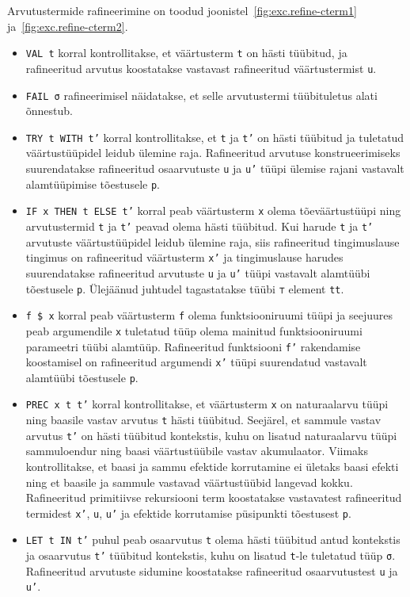 \documentclass[a4paper,12pt]{article}
\begin{document}
Arvutustermide rafineerimine on toodud joonistel~\ref{fig:exc.refine-cterm1} ja~\ref{fig:exc.refine-cterm2}.
\begin{itemize}
\item {\tt VAL t} korral kontrollitakse, et väärtusterm {\tt t} on hästi tüübitud, ja rafineeritud arvutus koostatakse vastavast rafineeritud väärtustermist {\tt u}.
\item {\tt FAIL σ} rafineerimisel näidatakse, et selle arvutustermi tüübituletus alati õnnestub.
\item {\tt TRY t WITH t'} korral kontrollitakse, et {\tt t} ja {\tt t'} on hästi tüübitud ja tuletatud väärtustüüpidel leidub ülemine raja. Rafineeritud arvutuse konstrueerimiseks suurendatakse rafineeritud osaarvutuste {\tt u} ja {\tt u'} tüüpi ülemise rajani vastavalt alamtüüpimise tõestusele {\tt p}.
\item {\tt IF x THEN t ELSE t'} korral peab väärtusterm {\tt x} olema tõeväärtustüüpi ning arvutustermid {\tt t} ja {\tt t'} peavad olema hästi tüübitud. Kui harude {\tt t} ja {\tt t'} arvutuste väärtustüüpidel leidub ülemine raja, siis rafineeritud tingimuslause tingimus on rafineeritud väärtusterm {\tt x'} ja tingimuslause harudes suurendatakse rafineeritud arvutuste {\tt u} ja {\tt u'} tüüpi vastavalt alamtüübi tõestusele {\tt p}. Ülejäänud juhtudel tagastatakse tüübi {\tt ⊤} element {\tt tt}.
\item {\tt f \$ x} korral peab väärtusterm {\tt f} olema funktsiooniruumi tüüpi ja seejuures peab argumendile {\tt x} tuletatud tüüp olema mainitud funktsiooniruumi parameetri tüübi alamtüüp. Rafineeritud funktsiooni {\tt f'} rakendamise koostamisel on rafineeritud argumendi {\tt x'} tüüpi suurendatud vastavalt alamtüübi tõestusele {\tt p}.
\item {\tt PREC x t t'} korral kontrollitakse, et väärtusterm {\tt x} on naturaalarvu tüüpi ning baasile vastav arvutus {\tt t} hästi tüübitud. Seejärel, et sammule vastav arvutus {\tt t'} on hästi tüübitud kontekstis, kuhu on lisatud naturaalarvu tüüpi sammuloendur ning baasi väärtustüübile vastav akumulaator. Viimaks kontrollitakse, et baasi ja sammu efektide korrutamine ei ületaks baasi efekti ning et baasile ja sammule vastavad väärtustüübid langevad kokku. Rafineeritud primitiivse rekursiooni term koostatakse vastavatest rafineeritud termidest {\tt x'}, {\tt u}, {\tt u'} ja efektide korrutamise püsipunkti tõestusest {\tt p}.
\item {\tt LET t IN t'} puhul peab osaarvutus {\tt t} olema hästi tüübitud antud kontekstis ja osaarvutus {\tt t'} tüübitud kontekstis, kuhu on lisatud {\tt t}-le tuletatud tüüp {\tt σ}. Rafineeritud arvutuste sidumine koostatakse rafineeritud osaarvutustest {\tt u} ja {\tt u'}.
\end{itemize}
\end{document}
